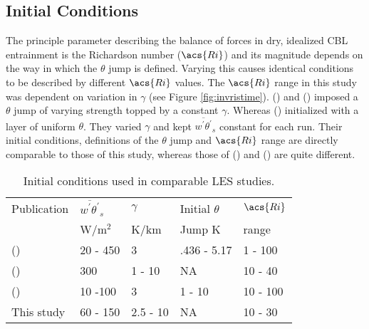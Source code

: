 \subsection{Initial Conditions}

The principle parameter describing the balance of forces in dry, idealized \acs{CBL} entrainment is the Richardson number ($\acs{Ri}$) and its magnitude depends on the way in which the $\theta$ jump is defined.  Varying this causes identical conditions to be described by different $\acs{Ri}$ values.  The $\acs{Ri}$ range in this study was dependent on variation in $\gamma$ (see Figure \ref{fig:invristime}).  \citeauthor{BrooksFowler2} (\citeyear{BrooksFowler2}) and \citeauthor{SullMoengStev} (\citeyear{SullMoengStev}) imposed a $\theta$ jump of varying strength topped by a constant $\gamma$.  Whereas \citeauthor{FedConzMir04} (\citeyear{FedConzMir04}) initialized with a layer of uniform $\theta$.  They varied $\gamma$ and kept $\overline{w^{'}\theta^{'}}_{s}$ constant for each run.  Their initial conditions, definitions of the $\theta$ jump and $\acs{Ri}$ range are directly comparable to those of this study, whereas those of \citeauthor{BrooksFowler2} (\citeyear{BrooksFowler2}) and \citeauthor{SullMoengStev} (\citeyear{SullMoengStev}) are quite different.\\    

\begin{table}[htbp]
\caption[]{Initial conditions used in comparable \acs{LES} studies.}

    \begin{center}
    \begin{tabular}{ p{4cm} p{1.4cm} p{1.4cm} p{1.7cm} p{1.8cm}}
Publication & $\overline{w^{'}\theta^{'}}_{s}$& $\gamma$& Initial $\theta$ & $\acs{Ri}$ \\ 
& W/m$^{2}$ & K/km & Jump K & range \\ \hline
      \citeauthor{SullMoengStev} (\citeyear{SullMoengStev}) & 20 - 450& 3  &.436 - 5.17 & 1 - 100\\ %
      \citeauthor{FedConzMir04} (\citeyear{FedConzMir04}) & 300 & 1 - 10 & NA & 10 - 40\\ %
      \citeauthor{BrooksFowler2} (\citeyear{BrooksFowler2}) &  10 -100 &  3& 1 - 10 &10 - 100 \\ %
      This study & 60 - 150 & 2.5 - 10& NA & 10 - 30\\ \hline 
      
    \end{tabular}
\label{table:initconditcomp}   
\end{center}    
\end{table}

